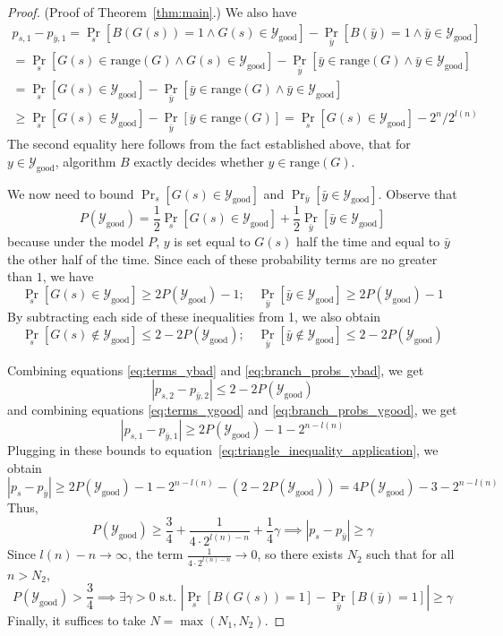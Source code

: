 \documentclass{article}
\def \Ygood{\mathcal{Y}_\text{good}}
\def \by{{\bar{y}}}
\theoremstyle{definition}
\theoremstyle{remark}
\begin{document}
\begin{proof}{(Proof of Theorem~\ref{thm:main}.)}
We also have
\begin{multline} \label{eq:terms_ygood}
p_{s, 1} - p_{\by, 1} =
\Pr_s[B(G(s)) = 1 \wedge G(s) \in \Ygood] - \Pr_\by[B(\by) = 1 \wedge \by \in \Ygood]
 \\
= 
\Pr_s[G(s) \in \text{range}(G) \wedge G(s) \in \Ygood] -
\Pr_\by[\by \in \text{range}(G) \wedge \by \in \Ygood]
\\
= \Pr_s[G(s) \in \Ygood] - \Pr_\by[\by \in \text{range}(G) \wedge \by \in \Ygood] \\
\geq \Pr_s[G(s) \in \Ygood] - \Pr_\by[\by \in \text{range}(G)] 
= \Pr_s[G(s) \in \Ygood] - 2^n/2^{l(n)}
\end{multline}
The second equality here follows from the fact established above, that for $y \in \Ygood$, algorithm $B$ exactly decides whether $y \in \text{range}(G)$.

We now need to bound $\Pr_s[G(s) \in \Ygood]$ and $\Pr_\by[\by \in \Ygood]$.
Observe that
$$
P(\Ygood) = \frac{1}{2}\Pr_s[G(s) \in \Ygood] + \frac{1}{2}\Pr_\by[\by \in \Ygood]
$$
because under the model $P$, $y$ is set equal to $G(s)$ half the time and equal to $\by$ the other half of the time.
Since each of these probability terms are no greater than $1$, we have
\begin{equation} \label{eq:branch_probs_ygood}
\Pr_s[G(s) \in \Ygood] \geq 2P(\Ygood) - 1;
\quad
\Pr_\by[\by \in \Ygood] \geq 2P(\Ygood) - 1        
\end{equation}
By subtracting each side of these inequalities from 1, we also obtain
\begin{equation} \label{eq:branch_probs_ybad}
\Pr_s[G(s) \notin \Ygood] \leq 2 - 2P(\Ygood);
\quad
\Pr_\by[\by \notin \Ygood] \leq 2 - 2P(\Ygood)
\end{equation}

Combining equations \ref{eq:terms_ybad} and \ref{eq:branch_probs_ybad}, we get
\begin{equation}
|p_{s, 2} - p_{\by, 2}| \leq 2 - 2P(\Ygood)    
\end{equation}
and combining equations \ref{eq:terms_ygood} and \ref{eq:branch_probs_ygood}, we get
\begin{equation} \label{eq:term1s_err_bound}
|p_{s, 1} - p_{\by, 1}| \geq 2P(\Ygood) - 1 - 2^{n - l(n)}    
\end{equation}
Plugging in these bounds to equation~\ref{eq:triangle_inequality_application}, we obtain
\begin{equation} \label{eq:final_ps_py_bound}
|p_s - p_\by| \geq
2P(\Ygood) - 1 - 2^{n - l(n)}
- (2 - 2P(\Ygood))
= 4 P(\Ygood) - 3 - 2^{n - l(n)}
\end{equation}
Thus, 
$$
P(\Ygood) \geq \frac{3}{4} + \frac{1}{4 \cdot 2^{l(n) - n}} + \frac{1}{4}\gamma
\implies |p_s - p_\by| \geq \gamma
$$
Since $l(n) - n \to \infty$, the term $\frac{1}{4 \cdot 2^{l(n) - n}} \to 0$,
so there exists $N_2$ such that for all $n > N_2$,
$$
P(\Ygood) > \frac{3}{4} \implies \exists \gamma > 0 \text{ s.t. } |\Pr_s[B(G(s)) = 1] - \Pr_{\bar{y}}[B(\bar{y}) = 1]| \geq \gamma
$$
Finally, it suffices to take $N = \max(N_1, N_2)$.


\end{proof}
\end{document}
